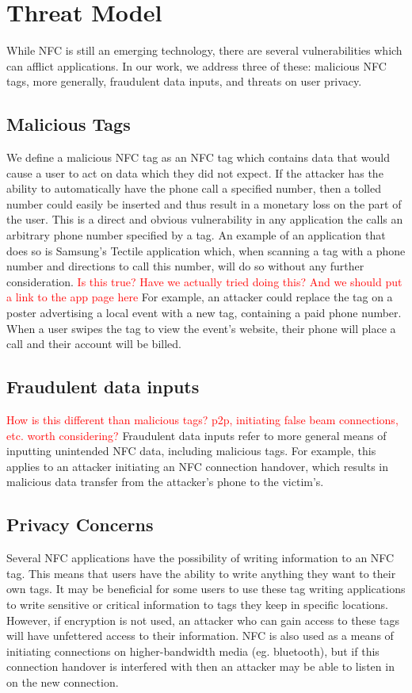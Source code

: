 \documentclass[12pt]{article}
\newcommand\TODO[1]{\textcolor{red}{#1}}
\begin{document}
\section{Threat Model}
While NFC is still an emerging technology, there are several vulnerabilities which can afflict applications.
In our work, we address three of these: malicious NFC tags, more generally, fraudulent data inputs, and threats on user privacy.
\subsection{Malicious Tags}
We define a malicious NFC tag as an NFC tag which contains data that would cause a user to act on data which they did not expect.
If the attacker has the ability to automatically have the phone call a specified number, then a tolled number could easily be inserted and thus result in a monetary loss on the part of the user. 
This is a direct and obvious vulnerability in any application the calls an arbitrary phone number specified by a tag.
An example of an application that does so is Samsung's Tectile application which, when scanning a tag with a phone number and directions to call this number, will do so without any further consideration. 
\TODO{Is this true? Have we actually tried doing this? And we should put a link to the app page here}
For example, an attacker could replace the tag on a poster advertising a local event with a new tag, containing a paid phone number.
When a user swipes the tag to view the event's website, their phone will place a call and their account will be billed.
\subsection{Fraudulent data inputs}
\TODO{How is this different than malicious tags? p2p, initiating false beam connections, etc. worth considering?}
Fraudulent data inputs refer to more general  means of inputting unintended NFC data, including malicious tags.
For example, this applies to an attacker initiating an NFC connection handover, which results in malicious data transfer from the attacker's phone to the victim's.

\subsection{Privacy Concerns}
Several NFC applications have the possibility of writing information to an NFC tag.
This means that users have the ability to write anything they want to their own tags.
It may be beneficial for some users to use these tag writing applications to write sensitive or critical information to tags they keep in specific locations.
However, if encryption is not used, an attacker who can gain access to these tags will have unfettered access to their information.
NFC is also used as a means of initiating connections on higher-bandwidth media (eg. bluetooth), but if this connection handover is interfered with then an attacker may be able to listen in on the new connection.
\end{document}
